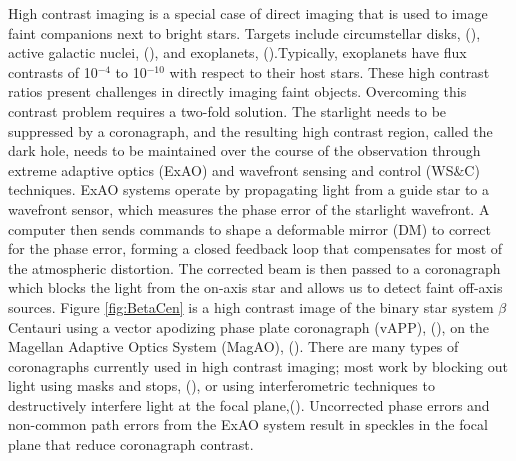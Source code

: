 High contrast imaging is a special case of direct imaging that is used to image faint companions next to bright stars. Targets include circumstellar disks, (\cite{rodigas2014morphology}), active galactic nuclei, (\cite{imanishi2020subaru}), and exoplanets, (\cite{bowler2016imaging}).Typically, exoplanets have flux contrasts of 10$^{-4}$ to 10$^{-10}$ with respect to their host stars. These high contrast ratios present challenges in directly imaging faint objects. Overcoming this contrast problem requires a two-fold solution. The starlight needs to be suppressed by a coronagraph, and the resulting high contrast region, called the dark hole, needs to be maintained over the course of the observation through extreme adaptive optics (ExAO) and wavefront sensing and control (WS$\&$C) techniques. ExAO systems operate by propagating light from a guide star to a wavefront sensor, which measures the phase error of the starlight wavefront. A computer then sends commands to shape a deformable mirror (DM) to correct for the phase error, forming a closed feedback loop that compensates for most of the atmospheric distortion. The corrected beam is then passed to a coronagraph which blocks the light from the on-axis star and allows us to detect faint off-axis sources. Figure \ref{fig:BetaCen} is a high contrast image of the binary star system $\beta$ Centauri using a vector apodizing phase plate coronagraph (vAPP), (\cite{snik2012vector}), on the Magellan Adaptive Optics System (MagAO), (\cite{close2018status}). There are many types of coronagraphs currently used in high contrast imaging; most work by blocking out light using masks and stops, (\cite{soummer2004apodized}), or using interferometric techniques to destructively interfere light at the focal plane,(\cite{foo2005optical}). Uncorrected phase errors and non-common path errors from the ExAO system result in speckles in the focal plane that reduce coronagraph contrast.
 

